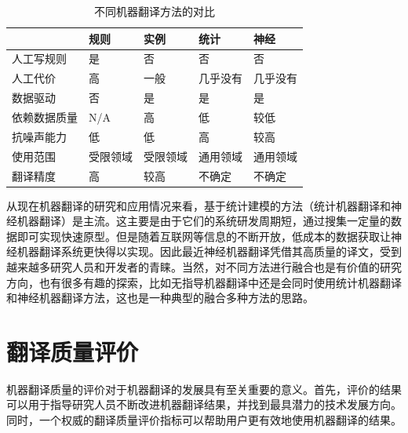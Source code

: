 \begin{table}[htp]{
\begin{center}
\caption{不同机器翻译方法的对比}
\label{tab:comparison-of-different-MT}
\begin{tabular}{l | l l l l}
& \parbox{3.8em}{规则} & \parbox{3.8em}{实例} & \parbox{3.8em}{统计} & \parbox{3.8em}
{神经} \\
\hline

人工写规则 & 是 & 否 & 否 & 否\\
人工代价 & 高 & 一般 & 几乎没有 & 几乎没有 \\
数据驱动 & 否 & 是 & 是 & 是\\
依赖数据质量 & N/A & 高 & 低 & 较低\\
抗噪声能力 & 低 & 低 & 高 & 较高 \\
使用范围 & 受限领域 & 受限领域 & 通用领域 & 通用领域 \\
翻译精度 & 高 & 较高 & 不确定 & 不确定 \\
\end{tabular}
\end{center}
\label{tab:1-1}
}\end{table}

\parinterval 从现在机器翻译的研究和应用情况来看，基于统计建模的方法（统计机器翻译和神经机器翻译）是主流。这主要是由于它们的系统研发周期短，通过搜集一定量的数据即可实现快速原型。但是随着互联网等信息的不断开放，低成本的数据获取让神经机器翻译系统更快得以实现。因此最近神经机器翻译凭借其高质量的译文，受到越来越多研究人员和开发者的青睐。当然，对不同方法进行融合也是有价值的研究方向，也有很多有趣的探索，比如无指导机器翻译中还是会同时使用统计机器翻译和神经机器翻译方法，这也是一种典型的融合多种方法的思路。


\sectionnewpage
\section{翻译质量评价}

\parinterval 机器翻译质量的评价对于机器翻译的发展具有至关重要的意义。首先，评价的结果可以用于指导研究人员不断改进机器翻译结果，并找到最具潜力的技术发展方向。同时，一个权威的翻译质量评价指标可以帮助用户更有效地使用机器翻译的结果。


